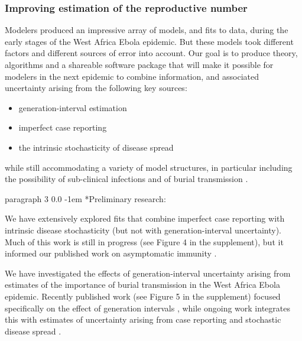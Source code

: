 \documentclass[12pt]{article}
\makeatletter
\renewcommand{\paragraph}{\vspace{0.40ex \@plus 0.2ex \@minus 0.0ex}\@startsection%
{paragraph}%
{3}%
{\parindent}%
{0.0\baselineskip}%
{-1em}%
{\normalfont\normalsize\bfseries}}%
\makeatother
\begin{document}
\subsubsection{Improving estimation of the reproductive number}

Modelers produced an impressive array of models, and fits to data, during the early stages of the West Africa Ebola epidemic. But these models took different factors and different sources of error into account. Our goal is to produce theory, algorithms and a shareable software package that will make it possible for modelers in the next epidemic to combine information, and associated uncertainty arising from the following key sources:

\begin{itemize}

\item generation-interval estimation

\item imperfect case reporting

\item the intrinsic stochasticity of disease spread

\end{itemize}

while still accommodating a variety of model structures, in particular including the possibility of sub-clinical infections \cite{BellPull14Asymp} and of burial transmission \cite{Ebola2014d}.

\paragraph*{Preliminary research:}

We have extensively explored fits that combine imperfect case reporting with intrinsic disease stochasticity (but not with generation-interval uncertainty). Much of this work is still in progress (see Figure 4 in the supplement), but it informed our published work on asymptomatic immunity \cite{BellPull14Asymp}.

We have investigated the effects of generation-interval uncertainty arising from estimates of the importance of burial transmission in the West Africa Ebola epidemic. Recently published work (see Figure 5 in the supplement) focused specifically on the effect of generation intervals \cite{WeitDush15}, while ongoing work integrates this with estimates of uncertainty arising from case reporting and stochastic disease spread \cite{TaylorPoster}.
\end{document}
